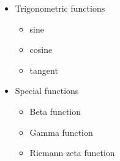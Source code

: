 \documentclass{article}
\begin{document}
\begin{itemize}
    \item Trigonometric functions
    \begin{itemize}
        \item sine
        \item cosine
        \item tangent
    \end{itemize}
    \item Special functions
    \begin{itemize}
        \item Beta function
        \item Gamma function
        \item Riemann zeta function
    \end{itemize}
\end{itemize}
\end{document}
